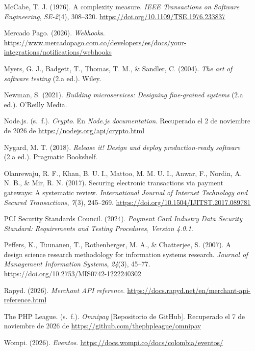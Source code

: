 \noindent McCabe, T. J. (1976). A complexity measure. \textit{IEEE Transactions on Software Engineering}, \textit{SE-2}(4), 308--320. \url{https://doi.org/10.1109/TSE.1976.233837}

\noindent Mercado Pago. (2026). \textit{Webhooks}. \url{https://www.mercadopago.com.co/developers/es/docs/your-integrations/notifications/webhooks}

\noindent Myers, G. J., Badgett, T., Thomas, T. M., \& Sandler, C. (2004). \textit{The art of software testing} (2.a ed.). Wiley.

\noindent Newman, S. (2021). \textit{Building microservices: Designing fine-grained systems} (2.a ed.). O'Reilly Media.

\noindent Node.js. (s.~f.). \textit{Crypto}. En \textit{Node.js documentation}. Recuperado el 2 de noviembre de 2026 de \url{https://nodejs.org/api/crypto.html}

\noindent Nygard, M. T. (2018). \textit{Release it! Design and deploy production-ready software} (2.a ed.). Pragmatic Bookshelf.

\noindent Olanrewaju, R. F., Khan, B. U. I., Mattoo, M. M. U. I., Anwar, F., Nordin, A. N. B., \& Mir, R. N. (2017). Securing electronic transactions via payment gateways: A systematic review. \textit{International Journal of Internet Technology and Secured Transactions}, \textit{7}(3), 245--269. \url{https://doi.org/10.1504/IJITST.2017.089781}

\noindent PCI Security Standards Council. (2024). \textit{Payment Card Industry Data Security Standard: Requirements and Testing Procedures, Version 4.0.1}.

\noindent Peffers, K., Tuunanen, T., Rothenberger, M. A., \& Chatterjee, S. (2007). A design science research methodology for information systems research. \textit{Journal of Management Information Systems}, \textit{24}(3), 45--77. \url{https://doi.org/10.2753/MIS0742-1222240302}

\noindent Rapyd. (2026). \textit{Merchant API reference}. \url{https://docs.rapyd.net/en/merchant-api-reference.html}

\noindent The PHP League. (s.~f.). \textit{Omnipay} [Repositorio de GitHub]. Recuperado el 7 de noviembre de 2026 de \url{https://github.com/thephpleague/omnipay}

\noindent Wompi. (2026). \textit{Eventos}. \url{https://docs.wompi.co/docs/colombia/eventos/}

\endgroup
